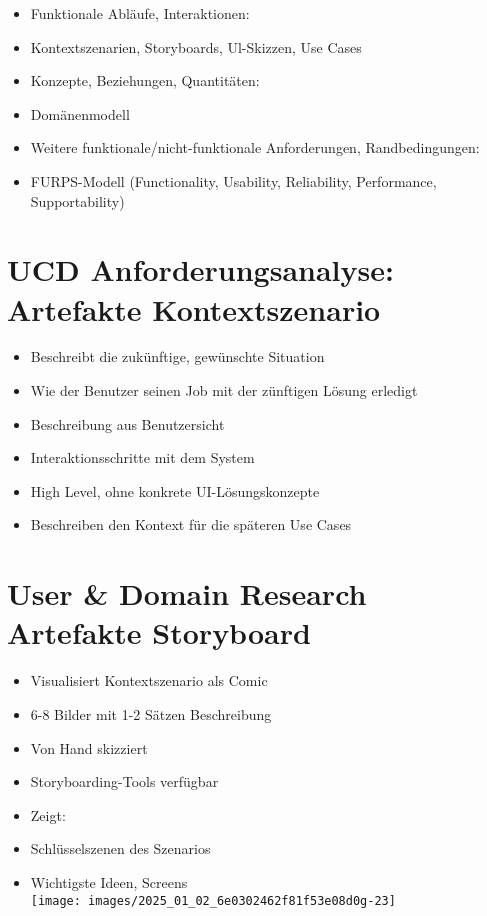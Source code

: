 \documentclass[10pt]{article}
\begin{document}
\begin{itemize}
  \item Funktionale Abläufe, Interaktionen:
  \item Kontextszenarien, Storyboards, Ul-Skizzen, Use Cases
  \item Konzepte, Beziehungen, Quantitäten:
  \item Domänenmodell
  \item Weitere funktionale/nicht-funktionale Anforderungen, Randbedingungen:
  \item FURPS-Modell (Functionality, Usability, Reliability, Performance, Supportability)
\end{itemize}

\section*{UCD Anforderungsanalyse: Artefakte Kontextszenario}
\begin{itemize}
  \item Beschreibt die zukünftige, gewünschte Situation
  \item Wie der Benutzer seinen Job mit der zünftigen Lösung erledigt
  \item Beschreibung aus Benutzersicht
  \item Interaktionsschritte mit dem System
  \item High Level, ohne konkrete UI-Lösungskonzepte
  \item Beschreiben den Kontext für die späteren Use Cases
\end{itemize}

\section*{User \& Domain Research Artefakte Storyboard}
\begin{itemize}
  \item Visualisiert Kontextszenario als Comic
  \item 6-8 Bilder mit 1-2 Sätzen Beschreibung
  \item Von Hand skizziert
  \item Storyboarding-Tools verfügbar
  \item Zeigt:
  \item Schlüsselszenen des Szenarios
  \item Wichtigste Ideen, Screens\\
\texttt{[image: images/2025\_01\_02\_6e0302462f81f53e08d0g-23]}
\end{itemize}
\end{document}
